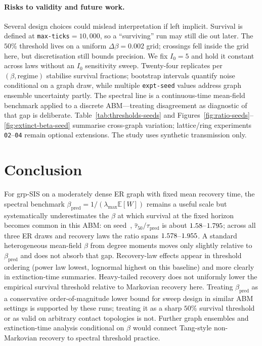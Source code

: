 \documentclass[11pt,a4paper]{article}
\begin{document}
\paragraph{Risks to validity and future work.}
Several design choices could mislead interpretation if left implicit. Survival is defined at \texttt{max-ticks}${}=10{,}000$, so a ``surviving'' run may still die out later. The $50\%$ threshold lives on a uniform $\Delta\beta=0.002$ grid; crossings fell inside the grid here, but discretisation still bounds precision. We fix $I_0{=}5$ and hold it constant across laws without an $I_0$ sensitivity sweep. Twenty-four replicates per $(\beta,\text{regime})$ stabilise survival fractions; bootstrap intervals quantify noise conditional on a graph draw, while multiple \texttt{expt-seed} values address graph ensemble uncertainty partly. The spectral line is a continuous-time mean-field benchmark applied to a discrete ABM---treating disagreement as diagnostic of that gap is deliberate. Table~\ref{tab:thresholds-seeds} and Figures~\ref{fig:ratio-seeds}--\ref{fig:extinct-beta-seed} summarise cross-graph variation; lattice/ring experiments \texttt{02}--\texttt{04} remain optional extensions. The study uses synthetic transmission only.

\section{Conclusion}
\label{sec:conclusion}

For grp-SIS on a moderately dense ER graph with fixed mean recovery time, the spectral benchmark $\beta_{\mathrm{pred}}=1/(\lambda_{\max}\mathbb{E}[W])$ remains a useful scale but systematically underestimates the $\beta$ at which survival at the fixed horizon becomes common in this ABM: on seed~\RepPrimarySeed{}, $\hat{\tau}_{50}/\tau_{\mathrm{pred}}$ is about $1.58$--$1.795$; across all three ER draws and recovery laws the ratio spans $1.578$--$1.955$. A standard heterogeneous mean-field $\beta$ from degree moments moves only slightly relative to $\beta_{\mathrm{pred}}$ and does not absorb that gap. Recovery-law effects appear in threshold ordering (power law lowest, lognormal highest on this baseline) and more clearly in extinction-time summaries. Heavy-tailed recovery does not uniformly lower the empirical survival threshold relative to Markovian recovery here. Treating $\beta_{\mathrm{pred}}$ as a conservative order-of-magnitude lower bound for sweep design in similar ABM settings is supported by these runs; treating it as a sharp $50\%$ survival threshold or as valid on arbitrary contact topologies is not. Further graph ensembles and extinction-time analysis conditional on $\beta$ would connect Tang-style non-Markovian recovery to spectral threshold practice.
\end{document}
